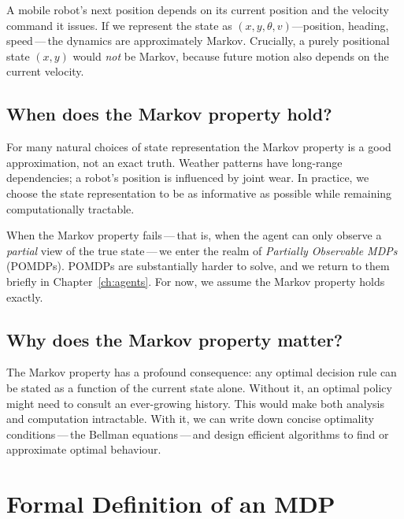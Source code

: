 \begin{example}
\label{ex:robot-nav}
A mobile robot's next position depends on its current position and the velocity command it issues. If we represent the state as $(x, y, \theta, v)$---position, heading, speed\,---\,the dynamics are approximately Markov. Crucially, a purely positional state $(x, y)$ would \emph{not} be Markov, because future motion also depends on the current velocity.
\end{example}

\subsection*{When does the Markov property hold?}

For many natural choices of state representation the Markov property is a good approximation, not an exact truth. Weather patterns have long-range dependencies; a robot's position is influenced by joint wear. In practice, we choose the state representation to be as informative as possible while remaining computationally tractable.

When the Markov property fails\,---\,that is, when the agent can only observe a \emph{partial} view of the true state\,---\,we enter the realm of \emph{Partially Observable MDPs} (POMDPs). POMDPs are substantially harder to solve, and we return to them briefly in Chapter~\ref{ch:agents}. For now, we assume the Markov property holds exactly.

\subsection*{Why does the Markov property matter?}

The Markov property has a profound consequence: any optimal decision rule can be stated as a function of the current state alone. Without it, an optimal policy might need to consult an ever-growing history. This would make both analysis and computation intractable. With it, we can write down concise optimality conditions\,---\,the Bellman equations\,---\,and design efficient algorithms to find or approximate optimal behaviour.


\section{Formal Definition of an MDP}
\label{sec:mdp-definition}


